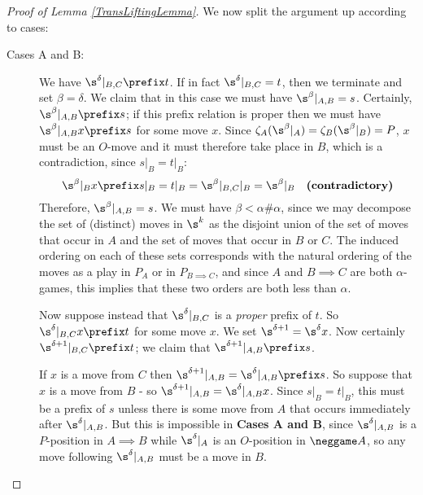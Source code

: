 \documentclass[11pt]{article} %
\begin{document}
\begin{proof}[Proof of Lemma \ref{TransLiftingLemma}]
  We now split the argument up according to cases:

  \begin{description}
    \item[Cases A and B: ] We have $\s^\delta\vert_{B,C}\prefix t$.  If in fact $\s^\delta\vert_{B,C}=t$, then we terminate and set $\beta=\delta$.  We claim that in this case we must have $\s^\beta\vert_{A,B}=s$.  Certainly, $\s^\beta\vert_{A,B}\prefix s$; if this prefix relation is proper then we must have $\s^\beta\vert_{A,B}x\prefix s$ for some move $x$.  Since $\zeta_A(\s^\beta\vert_A)=\zeta_B(\s^\beta\vert_B)=P$, $x$ must be an $O$-move and it must therefore take place in $B$, which is a contradiction, since $s\vert_B=t\vert_B$:
      \[
        \s^\beta\vert_Bx\prefix s\vert_B = t\vert_B=\s^\beta\vert_{B,C}\vert_B=\s^\beta\vert_B\quad\textbf{(contradictory)}
        \]
      Therefore, $\s^\beta\vert_{A,B}=s$.  We must have $\beta<\alpha\#\alpha$, since we may decompose the set of (distinct) moves in $\s^k$ as the disjoint union of the set of moves that occur in $A$ and the set of moves that occur in $B$ or $C$.  The induced ordering on each of these sets corresponds with the natural ordering of the moves as a play in $P_A$ or in $P_{B\implies C}$, and since $A$ and $B\implies C$ are both $\alpha$-games, this implies that these two orders are both less than $\alpha$.  

      Now suppose instead that $\s^\delta\vert_{B,C}$ is a \emph{proper} prefix of $t$.  So $\s^\delta\vert_{B,C}x\prefix t$ for some move $x$.  We set $\s^{\delta+1}=\s^\delta x$.  Now certainly $\s^{\delta+1}\vert_{B,C}\prefix t$; we claim that $\s^{\delta+1}\vert_{A,B}\prefix s$.

      If $x$ is a move from $C$ then $\s^{\delta+1}\vert_{A,B}=\s^\delta\vert_{A,B}\prefix s$.  So suppose that $x$ is a move from $B$ - so $\s^{\delta+1}\vert_{A,B}=\s^\delta\vert_{A,B}x$.  Since $s\vert_B=t\vert_B$, this must be a prefix of $s$ unless there is some move from $A$ that occurs immediately after $\s^\delta\vert_{A,B}$.  But this is impossible in \textbf{Cases A and B}, since $\s^\delta\vert_{A,B}$ is a $P$-position in $A\implies B$ while $\s^\delta\vert_A$ is an $O$-position in $\neggame A$, so any move following $\s^\delta\vert_{A,B}$ must be a move in $B$.


\end{description}
\end{proof}
\end{document}
